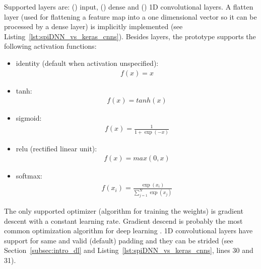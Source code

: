 \documentclass[]{article}
\begin{document}
Supported layers are: () input,
() dense and () 1D convolutional layers.
A flatten layer (used for flattening a feature map into a one
dimensional vector so it can be processed by a dense layer) is
implicitly implemented (see Listing~\ref{lst:spiDNN_vs_keras_cnns}).
Besides layers, the prototype supports the following activation
functions:
\begin{itemize}
  \item identity (default when activation unspecified):
    \begin{align}
      f(x) = x
    \end{align}
  \item tanh:
    \begin{align}
      f(x) = tanh(x)
    \end{align}
  \item sigmoid:
    \begin{align}
      f(x) = \frac{1}{1 + \exp(-x)}
    \end{align}
  \item relu (rectified linear unit):
    \begin{align}
      f(x) = max(0, x)
    \end{align}
  \item softmax:
    \begin{align}
      \label{eq:softmax}
      f(x_i) = \frac{\exp(x_i)}{\sum_{j=1}^{N}\exp(x_j)}
    \end{align}
\end{itemize}
The only supported optimizer (algorithm for training the weights) is
gradient descent with a constant learning rate.
Gradient descend is probably the most common optimization algorithm
for deep learning \citep{goodfellow_et_al_2016}.
1D convolutional layers have support for same and valid (default)
padding and they can be strided (see Section~\ref{subsec:intro_dl}
and Listing~\ref{lst:spiDNN_vs_keras_cnns}, lines 30 and 31).
\end{document}
